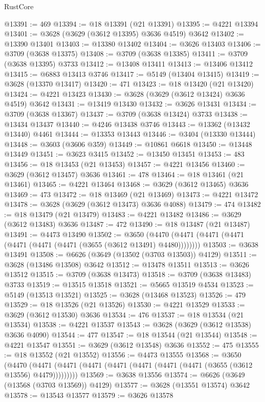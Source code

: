 \begin{lexlean}{RustCore}
\begin{coremodule}
@13391 := 469
@13394 := @18 @13391 (@21 @13391)
@13395 := @4221 @13394
@13401 := @3628 (@3629 (@3612 @13395) @3636 @4519) @3642
@13402 := @13390 @13401
@13403 := @13380 @13402
@13404 := @3626 @13403
@13406 := @3709 (@3638 @13375)
@13408 := @3709 (@3638 @13385)
@13411 := @3709 (@3638 @13395) @3733
@13412 := @13408 @13411
@13413 := @13406 @13412
@13415 := @6883 @13413 @3746
@13417 := @5149 (@13404 @13415)
@13419 := @3628 (@13370 @13417)
@13420 := 471
@13423 := @18 @13420 (@21 @13420)
@13424 := @4221 @13423
@13430 := @3628 (@3629 (@3612 @13424) @3636 @4519) @3642
@13431 := @13419 @13430
@13432 := @3626 @13431
@13434 := @3709 (@3638 @13367)
@13437 := @3709 (@3638 @13424) @3733
@13438 := @13434 @13437
@13440 := @4246 @13438 @3746
@13443 := @13362 (@13432 @13440) @4461
@13444 := @13353 @13443
@13446 := @3404 (@13330 @13444)
@13448 := @3603 (@3606 @359)
@13449 := @10861 @6618
@13450 := @13448 @13449
@13451 := @3623 @3415
@13452 := @13450 @13451
@13453 := 483
@13456 := @18 @13453 (@21 @13453)
@13457 := @4221 @13456
@13460 := @3629 (@3612 @13457) @3636
@13461 := 478
@13464 := @18 @13461 (@21 @13461)
@13465 := @4221 @13464
@13468 := @3629 (@3612 @13465) @3636
@13469 := 473
@13472 := @18 @13469 (@21 @13469)
@13473 := @4221 @13472
@13478 := @3628 (@3629 (@3612 @13473) @3636 @4088)
@13479 := 474
@13482 := @18 @13479 (@21 @13479)
@13483 := @4221 @13482
@13486 := @3629 (@3612 @13483) @3636
@13487 := 472
@13490 := @18 @13487 (@21 @13487)
@13491 := @4473 @13490
@13502 := @3650 (@4470 (@4471 (@4471 (@4471 (@4471 (@4471 (@4471 (@3655 (@3612 @13491) @4480))))))))
@13503 := @3638 @13491
@13508 := @6626 (@3649 (@13502 (@3703 @13503)) @4129)
@13511 := @3628 (@13486 @13508) @3642
@13512 := @13478 @13511
@13513 := @3626 @13512
@13515 := @3709 (@3638 @13473)
@13518 := @3709 (@3638 @13483) @3733
@13519 := @13515 @13518
@13521 := @5665 @13519 @4534
@13523 := @5149 (@13513 @13521)
@13525 := @3628 (@13468 @13523)
@13526 := 479
@13529 := @18 @13526 (@21 @13526)
@13530 := @4221 @13529
@13533 := @3629 (@3612 @13530) @3636
@13534 := 476
@13537 := @18 @13534 (@21 @13534)
@13538 := @4221 @13537
@13543 := @3628 (@3629 (@3612 @13538) @3636 @4090)
@13544 := 477
@13547 := @18 @13544 (@21 @13544)
@13548 := @4221 @13547
@13551 := @3629 (@3612 @13548) @3636
@13552 := 475
@13555 := @18 @13552 (@21 @13552)
@13556 := @4473 @13555
@13568 := @3650
    (@4470 (@4471 (@4471 (@4471 (@4471 (@4471 (@4471 (@4471 (@3655 (@3612 @13556) @4479)))))))))
@13569 := @3638 @13556
@13574 := @6626 (@3649 (@13568 (@3703 @13569)) @4129)
@13577 := @3628 (@13551 @13574) @3642
@13578 := @13543 @13577
@13579 := @3626 @13578

\end{coremodule}
\end{lexlean}
